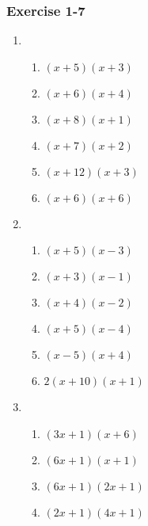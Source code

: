 {\begin{multicols}{3}
\subsubsection*{Exercise 1-7} %

\begin{enumerate}[noitemsep, label=\textbf{\arabic*}. ] 
\item %

\begin{enumerate}[noitemsep, label=\textbf{(\alph*)} ] 
\item $(x + 5)(x + 3)$%
\item $(x + 6)(x + 4)$%
\item $(x + 8)(x + 1)$%
\item $(x + 7)(x + 2)$%
\item $(x + 12)(x + 3)$%
\item $(x + 6)(x + 6)$%
\end{enumerate}



\item %

\begin{enumerate}[noitemsep, label=\textbf{(\alph*)} ]  
\item $(x + 5)(x - 3)$%
\item $(x + 3)(x - 1)$%
\item $(x + 4)(x - 2)$%
\item $(x + 5)(x - 4)$%
\item $(x - 5)(x + 4)$%
\item $2(x + 10)(x + 1)$%
\end{enumerate}



\item %

\begin{enumerate}[noitemsep, label=\textbf{(\alph*)} ] 


\item $(3x + 1)(x + 6)$%
\item $(6x + 1)(x + 1)$%
\item $(6x + 1)(2x + 1)$%
\item $(2x + 1)(4x + 1)$%
\end{enumerate}



\end{enumerate}
\end{multicols}}
